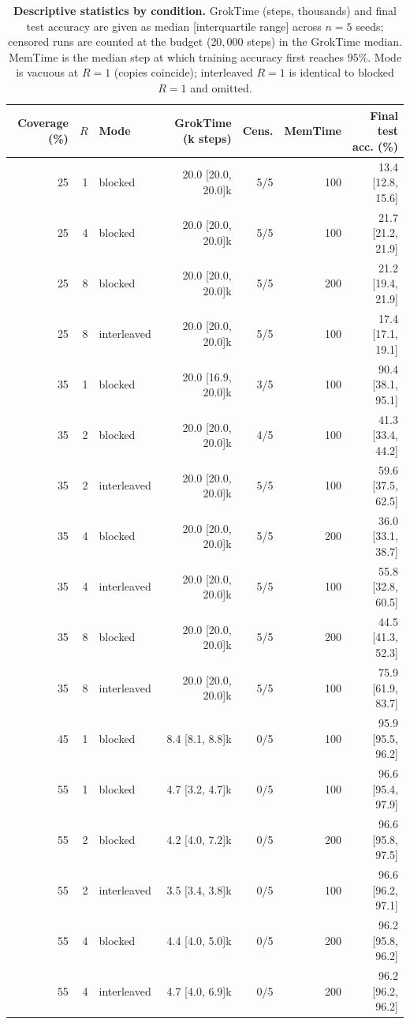 \begin{table}[t]
\centering
\caption{\textbf{Descriptive statistics by condition.} GrokTime (steps,
thousands) and final test accuracy are given as median [interquartile
range] across $n=5$ seeds; censored runs are counted at the budget
($20{,}000$ steps) in the GrokTime median. MemTime is the median step at
which training accuracy first reaches $95\%$. Mode is vacuous at $R=1$
(copies coincide); interleaved $R{=}1$ is identical to blocked $R{=}1$ and
omitted.}
\label{tab:descriptives}
\small
\begin{tabular}{rrlrrrr}
\toprule
Coverage (\%) & $R$ & Mode & GrokTime (k steps) & Cens. & MemTime & Final test acc. (\%) \\
\midrule
25 & 1 & blocked & 20.0 [20.0, 20.0]k & 5/5 & 100 & 13.4 [12.8, 15.6] \\
25 & 4 & blocked & 20.0 [20.0, 20.0]k & 5/5 & 100 & 21.7 [21.2, 21.9] \\
25 & 8 & blocked & 20.0 [20.0, 20.0]k & 5/5 & 200 & 21.2 [19.4, 21.9] \\
25 & 8 & interleaved & 20.0 [20.0, 20.0]k & 5/5 & 100 & 17.4 [17.1, 19.1] \\
35 & 1 & blocked & 20.0 [16.9, 20.0]k & 3/5 & 100 & 90.4 [38.1, 95.1] \\
35 & 2 & blocked & 20.0 [20.0, 20.0]k & 4/5 & 100 & 41.3 [33.4, 44.2] \\
35 & 2 & interleaved & 20.0 [20.0, 20.0]k & 5/5 & 100 & 59.6 [37.5, 62.5] \\
35 & 4 & blocked & 20.0 [20.0, 20.0]k & 5/5 & 200 & 36.0 [33.1, 38.7] \\
35 & 4 & interleaved & 20.0 [20.0, 20.0]k & 5/5 & 100 & 55.8 [32.8, 60.5] \\
35 & 8 & blocked & 20.0 [20.0, 20.0]k & 5/5 & 200 & 44.5 [41.3, 52.3] \\
35 & 8 & interleaved & 20.0 [20.0, 20.0]k & 5/5 & 100 & 75.9 [61.9, 83.7] \\
45 & 1 & blocked & 8.4 [8.1, 8.8]k & 0/5 & 100 & 95.9 [95.5, 96.2] \\
55 & 1 & blocked & 4.7 [3.2, 4.7]k & 0/5 & 100 & 96.6 [95.4, 97.9] \\
55 & 2 & blocked & 4.2 [4.0, 7.2]k & 0/5 & 200 & 96.6 [95.8, 97.5] \\
55 & 2 & interleaved & 3.5 [3.4, 3.8]k & 0/5 & 100 & 96.6 [96.2, 97.1] \\
55 & 4 & blocked & 4.4 [4.0, 5.0]k & 0/5 & 200 & 96.2 [95.8, 96.2] \\
55 & 4 & interleaved & 4.7 [4.0, 6.9]k & 0/5 & 200 & 96.2 [96.2, 96.2] \\

\end{tabular}
\end{table}
